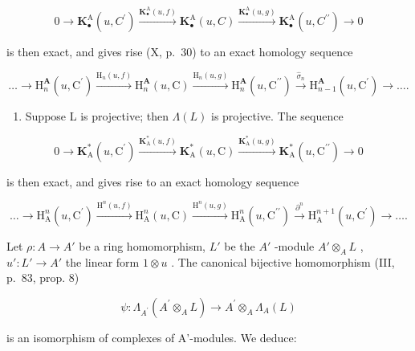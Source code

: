 \[
0 \rightarrow \mathbf {K} _ {\bullet} ^ {\mathrm{A}} (u, C ^ {\prime}) \xrightarrow {\mathbf {K} _ {\bullet} ^ {\mathrm{A}} (u , f)} \mathbf {K} _ {\bullet} ^ {\mathrm{A}} (u, C) \xrightarrow {\mathbf {K} _ {\bullet} ^ {\mathrm{A}} (u , g)} \mathbf {K} _ {\bullet} ^ {\mathrm{A}} (u, C ^ {\prime \prime}) \rightarrow 0
\]

is then exact, and gives rise (X, p.~30) to an exact homology sequence

\[
\dots \to \mathrm{H} _ {n} ^ {\mathbf {A}} (u, \mathrm{C} ^ {\prime}) \xrightarrow {\mathrm{H} _ {n} (u , f)} \mathrm{H} _ {n} ^ {\mathbf {A}} (u, \mathrm{C}) \xrightarrow {\mathrm{H} _ {n} (u , g)} \mathrm{H} _ {n} ^ {\mathbf {A}} (u, \mathrm{C} ^ {\prime \prime}) \xrightarrow {\hat {\sigma} _ {n}} \mathrm{H} _ {n - 1} ^ {\mathbf {A}} (u, \mathrm{C} ^ {\prime}) \to \dots .
\]

\begin{enumerate}
\def\labelenumi{\alph{enumi})}
\setcounter{enumi}{1}
\tightlist
\item
  Suppose L is projective; then \(\Lambda(L)\) is projective. The sequence
\end{enumerate}

\[
0 \rightarrow \mathbf {K} _ {\mathrm{A}} ^ {*} (u, \mathrm{C} ^ {\prime}) \xrightarrow {\mathbf {K} _ {\mathrm{A}} ^ {*} (u , f)} \mathbf {K} _ {\mathrm{A}} ^ {*} (u, \mathrm{C}) \xrightarrow {\mathbf {K} _ {\mathrm{A}} ^ {*} (u , g)} \mathbf {K} _ {\mathrm{A}} ^ {*} (u, \mathrm{C} ^ {\prime \prime}) \rightarrow 0
\]

is then exact, and gives rise to an exact homology sequence

\[
\dots \rightarrow \mathrm{H} _ {\mathrm{A}} ^ {n} (u, \mathrm{C} ^ {\prime}) \xrightarrow {\mathrm{H} ^ {n} (u , f)} \mathrm{H} _ {\mathrm{A}} ^ {n} (u, \mathrm{C}) \xrightarrow {\mathrm{H} ^ {n} (u , g)} \mathrm{H} _ {\mathrm{A}} ^ {n} (u, \mathrm{C} ^ {\prime \prime}) \xrightarrow {\partial^ {n}} \mathrm{H} _ {\mathrm{A}} ^ {n + 1} (u, \mathrm{C} ^ {\prime}) \rightarrow \dots .
\]

Let \(\rho: A \to A'\) be a ring homomorphism, \(L'\) be the \(A'\) -module \(A' \otimes_A L\) , \(u': L' \to A'\) the linear form \(1 \otimes u\) . The canonical bijective homomorphism (III, p.~83, prop. 8)

\[
\psi : \Lambda_ {A ^ {\prime}} (A ^ {\prime} \otimes_ {A} L) \rightarrow A ^ {\prime} \otimes_ {A} \Lambda_ {A} (L)
\]

is an isomorphism of complexes of A'-modules. We deduce:

